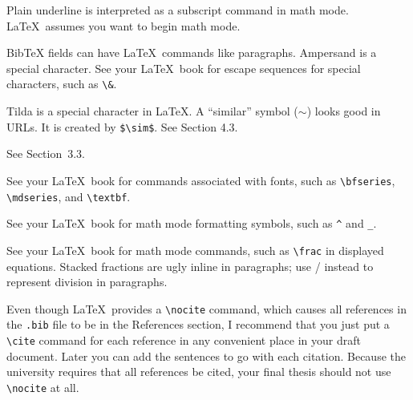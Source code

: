 Plain underline is interpreted as a
subscript command in math mode. 
\LaTeX\ assumes you want to begin math mode.

%
BibTeX fields can have \LaTeX\ commands like paragraphs.  
Ampersand is a special character.
See your \LaTeX\ book for escape sequences for special characters, 
such as \verb+\&+.

%
Tilda is a special character in \LaTeX.
A ``similar'' symbol ($\sim$) looks good in URLs.  
It is created by \verb+$\sim$+.  See Section 4.3.

%
See Section~3.3.

%
{\sloppy
See your \LaTeX\ book for commands associated with fonts,
such as \verb+\bfseries+,  
\verb+\mdseries+, 
and \verb+\textbf+.

} %

%
See your \LaTeX\ book for math mode formatting symbols,
such as \verb+^+ and \verb+_+.

%
See your \LaTeX\ book for math mode commands, 
such as \verb+\frac+ in displayed equations.
Stacked fractions are ugly inline in paragraphs; 
use / instead to represent division in paragraphs.

%
{\sloppy
Even though \LaTeX\ provides a \verb+\nocite+ command,
which causes all references in the {\tt *.bib} file to be in the References section,
I recommend that you just put a \verb+\cite+ command 
for each reference in any convenient place in your draft document.  
Later you can add the sentences to go with each citation.
Because the university requires that all references be cited,
your final thesis should not use 
\verb+\nocite+ at all.

} %

